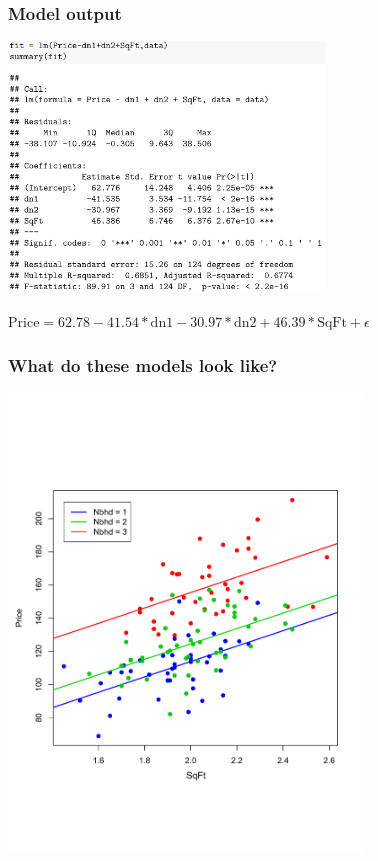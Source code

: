 \documentclass{beamer}
\newcommand{\sko}{\vspace{.1in}}
\begin{document}
\begin{frame}
	\frametitle{Model output}
	
\sko	
\hspace*{8mm}\includegraphics[width=3.3in]{figures/houseMLR1}	

\sko
$
\text{Price} = 62.78 -41.54 * \text{dn1} -30.97 * \text{dn2} + 46.39 * \text{SqFt} + \epsilon
$

\end{frame}

\begin{frame}
\frametitle{What do these models look like?}

\vspace{-2.3cm}
\begin{center}
\includegraphics[width=3.7in]{figures/MidCityPlot1}
\end{center}
\end{frame}
\end{document}
